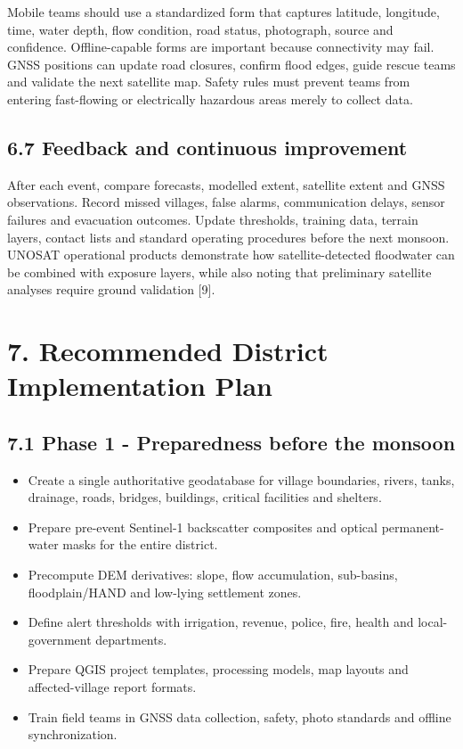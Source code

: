 \documentclass[11pt,a4paper]{article}
\begin{document}
Mobile teams should use a standardized form that captures latitude, longitude, time, water depth, flow condition, road status, photograph, source and confidence. Offline-capable forms are important because connectivity may fail. GNSS positions can update road closures, confirm flood edges, guide rescue teams and validate the next satellite map. Safety rules must prevent teams from entering fast-flowing or electrically hazardous areas merely to collect data.

\subsection{6.7 Feedback and continuous improvement}\label{feedback-and-continuous-improvement}

After each event, compare forecasts, modelled extent, satellite extent and GNSS observations. Record missed villages, false alarms, communication delays, sensor failures and evacuation outcomes. Update thresholds, training data, terrain layers, contact lists and standard operating procedures before the next monsoon. UNOSAT operational products demonstrate how satellite-detected floodwater can be combined with exposure layers, while also noting that preliminary satellite analyses require ground validation {[}9{]}.

\section{7. Recommended District Implementation Plan}\label{recommended-district-implementation-plan}

\subsection{7.1 Phase 1 - Preparedness before the monsoon}\label{phase-1---preparedness-before-the-monsoon}

\begin{itemize}
\item
  Create a single authoritative geodatabase for village boundaries, rivers, tanks, drainage, roads, bridges, buildings, critical facilities and shelters.
\item
  Prepare pre-event Sentinel-1 backscatter composites and optical permanent-water masks for the entire district.
\item
  Precompute DEM derivatives: slope, flow accumulation, sub-basins, floodplain/HAND and low-lying settlement zones.
\item
  Define alert thresholds with irrigation, revenue, police, fire, health and local-government departments.
\item
  Prepare QGIS project templates, processing models, map layouts and affected-village report formats.
\item
  Train field teams in GNSS data collection, safety, photo standards and offline synchronization.
\end{itemize}
\end{document}
